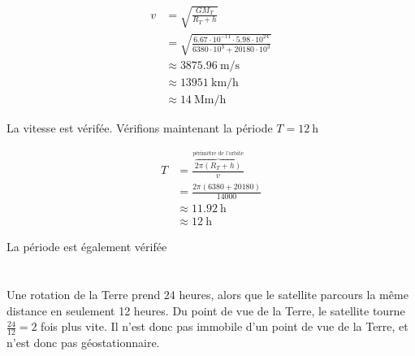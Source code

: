 \documentclass{article}
\begin{document}
\begin{equation*}
  \begin{split}
    v &= \sqrt{\frac{GM_T}{R_T+h}} \\
      &= \sqrt{\frac{6.67\cdot10^{-11}\cdot5.98\cdot10^{24}}{6380\cdot10^3+20180\cdot10^3}} \\
      &\approx \SI{3875.96}{\meter\per\second} \\
      &\approx \SI{13951}{\kilo\meter\per\hour} \\
      &\approx \SI{14}{\mega\meter\per\hour}
  \end{split}
\end{equation*}

La vitesse est vérifée. Vérifions maintenant la période $T = \SI{12}{\hour}$

\begin{equation*}
  \begin{split}
    T &= \frac{\overbrace{2\pi (R_T+h)}^{\text{périmètre de l'orbite}}}{v} \\
    &= \frac{2\pi (6380+20180)}{14000} \\
    &\approx \SI{11.92}{\hour} \\
    &\approx \SI{12}{\hour}
  \end{split}
\end{equation*}

La période est également vérifée

\section{}

Une rotation de la Terre prend 24 heures, alors que le satellite parcours la même distance en seulement 12 heures. Du point de vue de la Terre, le satellite tourne $\frac{24}{12} = 2$ fois plus vite. Il n'est donc pas immobile d'un point de vue de la Terre, et n'est donc pas géostationnaire.
\end{document}
